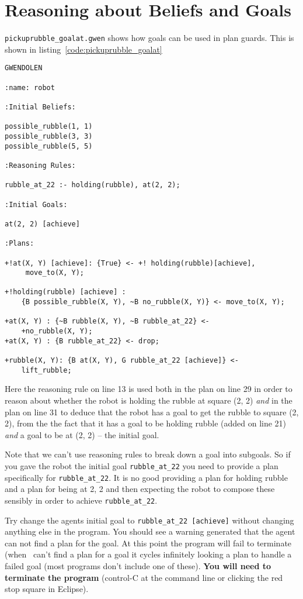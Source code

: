 \documentclass[a4]{article}
\begin{document}
\section{Reasoning about Beliefs and Goals}
\texttt{pickuprubble\_goalat.gwen} shows how goals can be used in plan guards.  This is shown in listing~\ref{code:pickuprubble_goalat}
\begin{lstlisting}[float,caption=Pick Up Rubble (Reasoning about Goals),basicstyle=\sffamily,style=easslisting,language=Gwendolen,label=code:pickuprubble_goalat]
GWENDOLEN

:name: robot

:Initial Beliefs:

possible_rubble(1, 1)
possible_rubble(3, 3)
possible_rubble(5, 5)

:Reasoning Rules:

rubble_at_22 :- holding(rubble), at(2, 2);

:Initial Goals:

at(2, 2) [achieve]

:Plans:

+!at(X, Y) [achieve]: {True} <- +! holding(rubble)[achieve],
     move_to(X, Y);

+!holding(rubble) [achieve] : 
    {B possible_rubble(X, Y), ~B no_rubble(X, Y)} <- move_to(X, Y);

+at(X, Y) : {~B rubble(X, Y), ~B rubble_at_22} <- 
    +no_rubble(X, Y);
+at(X, Y) : {B rubble_at_22} <- drop;

+rubble(X, Y): {B at(X, Y), G rubble_at_22 [achieve]} <- 
    lift_rubble;
\end{lstlisting}
Here the reasoning rule on line 13 is used both in the plan on line 29 in order to reason about whether the robot is holding the rubble at square (2, 2) \emph{and} in the plan on line 31 to deduce that the robot has a goal to get the rubble to square (2, 2), from the the fact that it has a goal to be holding rubble (added on line 21) \emph{and} a goal to be at (2, 2) -- the initial goal.

Note that we can't use reasoning rules to break down a goal into subgoals.  So if you gave the robot the initial goal \lstinline{rubble_at_22} you need to provide a plan specifically for \lstinline{rubble_at_22}.  It is no good providing a plan for holding rubble and a plan for being at 2, 2 and then expecting the robot to compose these sensibly in order to achieve \lstinline{rubble_at_22}.

Try change the agents initial goal to \lstinline{rubble_at_22 [achieve]} without changing anything else in the program.  You should see a warning generated that the agent can not find a plan for the goal.  At this point the program will fail to terminate (when \gwendolen\ can't find a plan for a goal it cycles infinitely looking a plan to handle a failed goal (most programs don't include one of these).  {\bf You will need to terminate the program} (control-C at the command line or clicking the red stop square in Eclipse).
\end{document}
